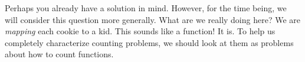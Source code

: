 \documentclass[12pt]{article}
\begin{document}
Perhaps you already have a solution in mind.  However, for the time being, we will consider this question more generally.  What are we really doing here?  We are {\em mapping} each cookie to a kid.  This sounds like a function!  It is.  To help us completely characterize counting problems, we should look at them as problems about how to count functions.  %

%
%
%
%
%
%
\end{document}
